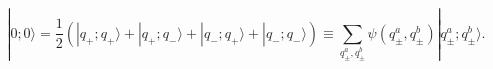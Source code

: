 \begin{equation}
|0;0 \rangle=\frac{1}{2}\left(
|q_+;q_+ \rangle + |q_+;q_- \rangle + |q_-;q_+ \rangle + |q_-;q_- \rangle
\right) \equiv \sum_{q^a_{\pm},q^b_{\pm}} 
\psi(q^a_{\pm},q^b_{\pm})|q^a_{\pm};
q^b_{\pm} \rangle.
\end{equation}

